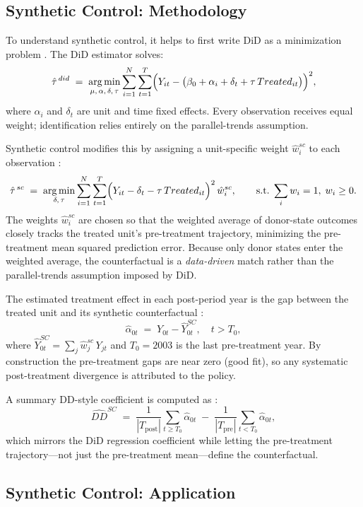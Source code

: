 \documentclass[12pt]{article}
\begin{document}
\subsection*{Synthetic Control: Methodology}

To understand synthetic control, it helps to first write DiD as a
minimization problem \cite{synthdid_notebook}.
The DiD estimator solves:
\[
  \hat{\tau}^{\,did} \;=\; \underset{\mu,\,\alpha,\,\delta,\,\tau}{\arg\min}
    \sum_{i=1}^{N}\sum_{t=1}^{T}
    \Bigl(Y_{it} - \bigl(\beta_0 + \alpha_i + \delta_t
      + \tau\,Treated_{it}\bigr)\Bigr)^2,
\]
where $\alpha_i$ and $\delta_t$ are unit and time fixed effects.
Every observation receives equal weight; identification relies entirely on
the parallel-trends assumption.

Synthetic control modifies this by assigning a unit-specific weight
$\hat{w}^{sc}_i$ to each observation \cite{synthdid_notebook}:
\[
  \hat{\tau}^{\,sc} \;=\; \underset{\delta,\,\tau}{\arg\min}
    \sum_{i=1}^{N}\sum_{t=1}^{T}
    \Bigl(Y_{it} - \delta_t - \tau\,Treated_{it}\Bigr)^2\,\hat{w}^{sc}_i,
    \qquad \text{s.t.}\;\sum_i w_i = 1,\; w_i \geq 0.
\]
The weights $\hat{w}^{sc}_i$ are chosen so that the weighted average of
donor-state outcomes closely tracks the treated unit's pre-treatment
trajectory, minimizing the pre-treatment mean squared prediction error.
Because only donor states enter the weighted average, the counterfactual
is a \emph{data-driven} match rather than the parallel-trends assumption
imposed by DiD.

The estimated treatment effect in each post-period year is the gap between
the treated unit and its synthetic counterfactual \cite{abadie2010}:
\[
  \hat{\alpha}_{0t} \;=\; Y_{0t} - \hat{Y}_{0t}^{SC}, \quad t > T_0,
\]
where $\hat{Y}_{0t}^{SC} = \sum_{j} \hat{w}^{sc}_j\,Y_{jt}$ and
$T_0 = 2003$ is the last pre-treatment year.
By construction the pre-treatment gaps are near zero (good fit), so any
systematic post-treatment divergence is attributed to the policy.

A summary DD-style coefficient is computed as \cite{abadie2010}:
\[
  \widehat{DD}^{SC} \;=\;
    \frac{1}{|T_{\text{post}}|}\sum_{t \geq T_0}\hat{\alpha}_{0t}
  \;-\;
    \frac{1}{|T_{\text{pre}}|}\sum_{t < T_0}\hat{\alpha}_{0t},
\]
which mirrors the DiD regression coefficient while letting the
pre-treatment trajectory—not just the pre-treatment mean—define the
counterfactual.

\subsection*{Synthetic Control: Application}
\end{document}
